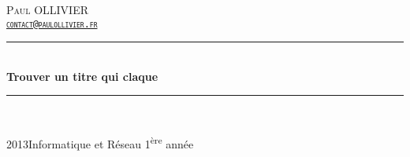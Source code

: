 \newcommand{\HRule}{\rule{\linewidth}{0.5mm}}
\begin{titlepage}
\begin{center}


\hfill\textsc{\LARGE Paul OLLIVIER\\
\hfill\href{mailto:contact@paulollivier.fr}{\texttt{contact@paulollivier.fr}}}

\HRule \\[0.4cm]
{ \huge \bfseries Trouver un titre qui claque \\[0.4cm] }

\HRule \\[1.5cm]
\vfill

{\large 2013\hfill Informatique et Réseau 1\textsuperscript{ère} année}

\end{center}
\end{titlepage}
